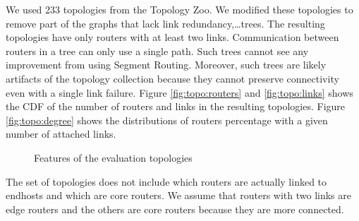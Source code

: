 We used 233 topologies from the Topology Zoo.
We modified these topologies to remove part of the graphs that lack link redundancy,\dots trees.
The resulting topologies have only routers with at least two links.
Communication between routers in a tree can only use a single path.
Such trees cannot see any improvement from using Segment Routing.
Moreover, such trees are likely artifacts of the topology collection
because they cannot preserve connectivity even with a single link failure.
Figure \ref{fig:topo:routers} and \ref{fig:topo:links} shows the CDF
of the number of routers and links in the resulting topologies.
Figure \ref{fig:topo:degree} shows the distributions of routers percentage with a given number
of attached links.

\begin{figure}
	\centering
	\caption{Features of the evaluation topologies}
	\label{fig:topo}
\end{figure}

The set of topologies does not include which routers are actually linked to endhosts
and which are core routers. We assume that routers with two links are edge routers
and the others are core routers because they are more connected.

